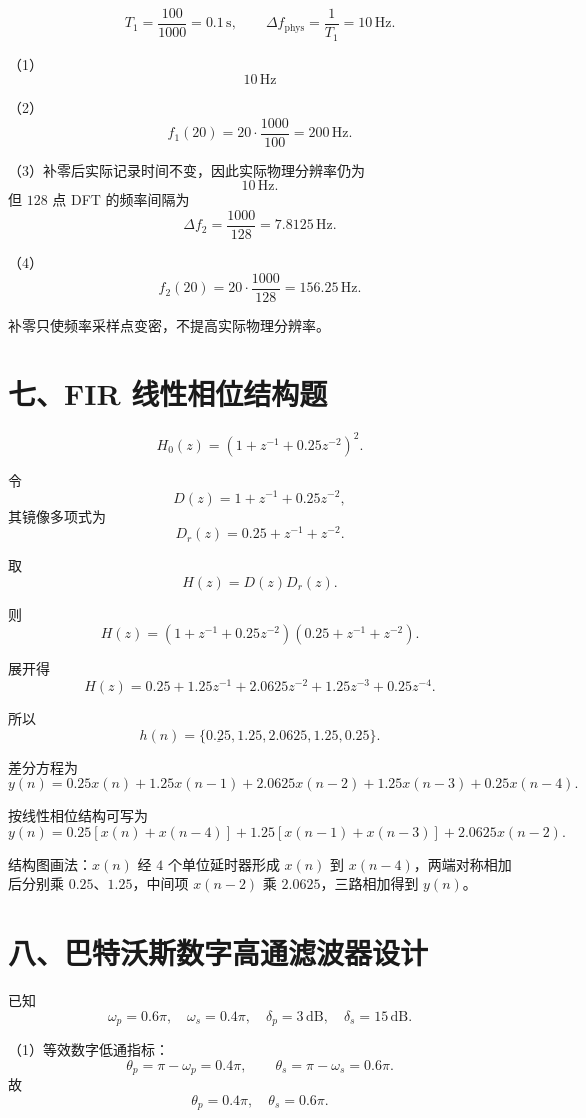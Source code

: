 \documentclass[UTF8,a4paper,12pt]{ctexart}
\begin{document}
\[
T_1=\frac{100}{1000}=0.1\,\mathrm{s},
\qquad
\Delta f_{\mathrm{phys}}=\frac{1}{T_1}=10\,\mathrm{Hz}.
\]

（1）
\[
\boxed{10\,\mathrm{Hz}}
\]

（2）
\[
f_1(20)=20\cdot\frac{1000}{100}=200\,\mathrm{Hz}.
\]

（3）补零后实际记录时间不变，因此实际物理分辨率仍为
\[
\boxed{10\,\mathrm{Hz}}.
\]
但 $128$ 点 DFT 的频率间隔为
\[
\Delta f_2=\frac{1000}{128}=7.8125\,\mathrm{Hz}.
\]

（4）
\[
f_2(20)=20\cdot\frac{1000}{128}=156.25\,\mathrm{Hz}.
\]

补零只使频率采样点变密，不提高实际物理分辨率。

\section*{七、FIR 线性相位结构题}

\[
H_0(z)=\left(1+z^{-1}+0.25z^{-2}\right)^2.
\]

令
\[
D(z)=1+z^{-1}+0.25z^{-2},
\]
其镜像多项式为
\[
D_r(z)=0.25+z^{-1}+z^{-2}.
\]

取
\[
H(z)=D(z)D_r(z).
\]

则
\[
H(z)=
\left(1+z^{-1}+0.25z^{-2}\right)
\left(0.25+z^{-1}+z^{-2}\right).
\]

展开得
\[
H(z)=0.25+1.25z^{-1}+2.0625z^{-2}+1.25z^{-3}+0.25z^{-4}.
\]

所以
\[
h(n)=\{\underline{0.25},1.25,2.0625,1.25,0.25\}.
\]

差分方程为
\[
y(n)=0.25x(n)+1.25x(n-1)+2.0625x(n-2)+1.25x(n-3)+0.25x(n-4).
\]

按线性相位结构可写为
\[
y(n)=0.25[x(n)+x(n-4)]
+1.25[x(n-1)+x(n-3)]
+2.0625x(n-2).
\]

结构图画法：$x(n)$ 经 $4$ 个单位延时器形成 $x(n)$ 到 $x(n-4)$，两端对称相加后分别乘 $0.25$、$1.25$，中间项 $x(n-2)$ 乘 $2.0625$，三路相加得到 $y(n)$。

\section*{八、巴特沃斯数字高通滤波器设计}

已知
\[
\omega_p=0.6\pi,\quad \omega_s=0.4\pi,
\quad
\delta_p=3\,\mathrm{dB},\quad \delta_s=15\,\mathrm{dB}.
\]

（1）等效数字低通指标：
\[
\theta_p=\pi-\omega_p=0.4\pi,
\qquad
\theta_s=\pi-\omega_s=0.6\pi.
\]
故
\[
\boxed{\theta_p=0.4\pi,\quad \theta_s=0.6\pi}.
\]
\end{document}

